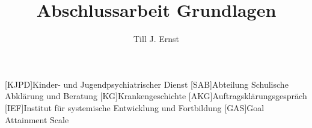 


\title{Abschlussarbeit Grundlagen}
\author{Till J. Ernst}






\tableofcontents
\newpage

\begin{acronym}[KJPD]
[KJPD]{Kinder- und Jugendpsychiatrischer Dienst}
[SAB]{Abteilung Schulische Abklärung und Beratung}
[KG]{Krankengeschichte}
[AKG]{Auftragsklärungsgespräch}
[IEF]{Institut für systemische Entwicklung und Fortbildung}
[GAS]{Goal Attainment Scale}
\end{acronym}
\newpage












\begin{flushleft}
{}
\end{flushleft}


%
%
%